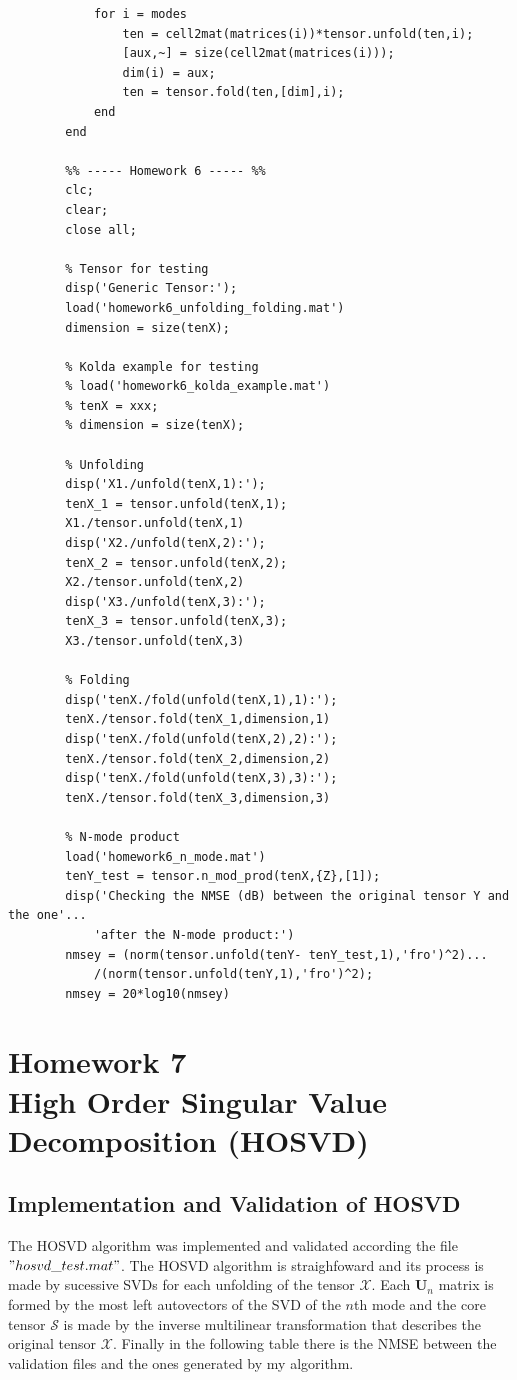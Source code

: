 \documentclass[a4paper,10pt]{article}
\begin{document}
\begin{verbatim}
            for i = modes
                ten = cell2mat(matrices(i))*tensor.unfold(ten,i);
                [aux,~] = size(cell2mat(matrices(i)));
                dim(i) = aux;
                ten = tensor.fold(ten,[dim],i);
            end
        end

        %% ----- Homework 6 ----- %%
        clc;
        clear;
        close all;

        % Tensor for testing
        disp('Generic Tensor:');
        load('homework6_unfolding_folding.mat')
        dimension = size(tenX);

        % Kolda example for testing
        % load('homework6_kolda_example.mat')
        % tenX = xxx;
        % dimension = size(tenX);

        % Unfolding
        disp('X1./unfold(tenX,1):');
        tenX_1 = tensor.unfold(tenX,1);
        X1./tensor.unfold(tenX,1)
        disp('X2./unfold(tenX,2):');
        tenX_2 = tensor.unfold(tenX,2);
        X2./tensor.unfold(tenX,2)
        disp('X3./unfold(tenX,3):');
        tenX_3 = tensor.unfold(tenX,3);
        X3./tensor.unfold(tenX,3)

        % Folding
        disp('tenX./fold(unfold(tenX,1),1):');
        tenX./tensor.fold(tenX_1,dimension,1)
        disp('tenX./fold(unfold(tenX,2),2):');
        tenX./tensor.fold(tenX_2,dimension,2)
        disp('tenX./fold(unfold(tenX,3),3):');
        tenX./tensor.fold(tenX_3,dimension,3)

        % N-mode product
        load('homework6_n_mode.mat')
        tenY_test = tensor.n_mod_prod(tenX,{Z},[1]);
        disp('Checking the NMSE (dB) between the original tensor Y and the one'... 
            'after the N-mode product:')
        nmsey = (norm(tensor.unfold(tenY- tenY_test,1),'fro')^2)...
            /(norm(tensor.unfold(tenY,1),'fro')^2);
        nmsey = 20*log10(nmsey)
    \end{verbatim}
    
\newpage
\section*{Homework 7 \\ High Order Singular Value Decomposition (HOSVD)}

    \subsection*{Implementation and Validation of HOSVD}

    The HOSVD algorithm was implemented and validated according the file $"hosvd\_test.mat"$. The HOSVD algorithm is straighfoward  and its process is made by sucessive SVDs
    for each unfolding of the tensor $\mathcal{X}$. Each $\boldsymbol{U}_{n}$ matrix is formed by the most left autovectors of the SVD of the $n$th mode and the core tensor 
    $\mathcal{S}$ is made by the inverse multilinear transformation that describes the original tensor $\mathcal{X}$. Finally in the following table there is the NMSE between
    the validation files and the ones generated by my algorithm. 
\end{document}
